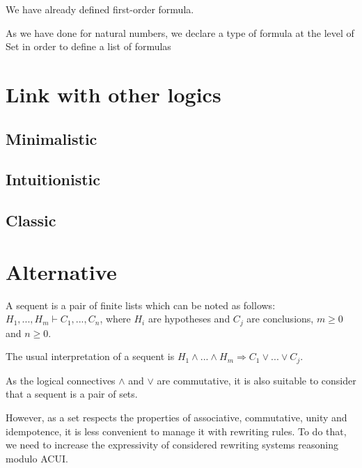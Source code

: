 \documentclass{article}
\begin{document}
	
	
	We have already defined first-order formula.
	
	As we have done for natural numbers, we declare a type of formula at the level of Set in order to define a list of formulas
	
	
	
	
	
	
	
	
	
	
	
	\section{Link with other logics}
	
	\subsection{Minimalistic}
	
	\subsection{Intuitionistic}
	
	\subsection{Classic}
	
	
	\section{Alternative}
	
	A sequent is a pair of finite lists which can be noted as follows: $H_1,...,H_m \vdash C_1,...,C_n$, where $H_i$ are hypotheses and $C_j$ are conclusions, $m \ge 0$ and $n \ge 0$.
	
	The usual interpretation of a sequent is
	$H_1 \land ... \land H_m \Rightarrow C_1 \lor ... \lor C_j$.
	
	As the logical connectives $\land$ and $\lor$ are commutative, it is also suitable to consider that a sequent is a pair of sets.
	
	However, as a set respects the properties of associative, commutative, unity and idempotence, it is less convenient to manage it with rewriting rules.
	To do that, we need to increase the expressivity of considered rewriting systems reasoning modulo ACUI.
	
\end{document}
